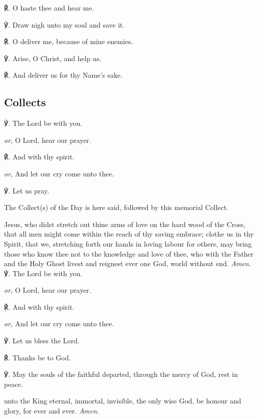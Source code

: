 \begin{multicols}{2}
℟. O haste thee and hear me.

℣. Draw nigh unto my soul and save it.

℟. O deliver me, because of mine enemies.

℣. Arise, O Christ, and help us.

℟. And deliver us for thy Name's sake.

\subsection{Collects}
℣. The Lord be with you.\par
\textit{or,} O Lord, hear our prayer.

℟. And with thy spirit.\par
\textit{or,} And let our cry come unto thee.

℣. Let us pray.

\begin{rubric}
	The Collect(s) of the Day is here said, followed by this memorial Collect.
\end{rubric}

 Jesus, who didst stretch out thine arms of love on the hard wood of the Cross, that all men might come within the reach of thy saving embrace; clothe us in thy Spirit, that we, stretching forth our hands in loving labour for others, may bring those who know thee not to the knowledge and love of thee, who with the Father and the Holy Ghost livest and reignest ever one God, world without end. \textit{Amen.}\\

℣. The Lord be with you.\par
\textit{or,} O Lord, hear our prayer.

℟. And with thy spirit.\par
\textit{or,} And let our cry come unto thee.

℣. Let us bless the Lord.

℟. Thanks be to God.

℣. May the souls {} of the faithful departed, through the mercy of God, rest in peace.

 unto the King eternal, immortal, invisible, the only wise God, be honour and glory, for ever and ever. \textit{Amen.}

\end{multicols}

